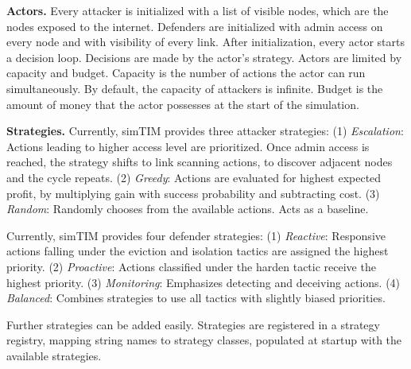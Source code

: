 \documentclass{llncs}
\begin{document}
\textbf{Actors.}
Every attacker is initialized with a list of visible nodes, which are the nodes exposed to the internet.
Defenders are initialized with admin access on every node and with visibility of every link.
After initialization, every actor starts a decision loop. Decisions are made by the actor's strategy.
Actors are limited by capacity and budget. Capacity is the number of actions the actor can run simultaneously. By default, the capacity of attackers is infinite. %
Budget is the amount of money that the actor possesses at the start of the simulation.

\textbf{Strategies.}
Currently, simTIM provides three attacker strategies:
(1) \emph{Escalation}: Actions leading to higher access level are prioritized. Once admin access is reached, the strategy shifts to link scanning actions, to discover adjacent nodes and the cycle repeats.
(2) \emph{Greedy}: Actions are evaluated for highest expected profit, by multiplying gain with success probability and subtracting cost.
(3) \emph{Random}: Randomly chooses from the available actions. Acts as a baseline.%

Currently, simTIM provides four defender strategies:
(1) \emph{Reactive}: Responsive actions falling under the eviction and isolation tactics are assigned the highest priority.
(2) \emph{Proactive}: Actions classified under the harden tactic receive the highest priority.
(3) \emph{Monitoring}: Emphasizes detecting and deceiving actions.
(4) \emph{Balanced}: Combines strategies to use all tactics with slightly biased priorities.

Further strategies can be added easily.
Strategies are registered in a strategy registry, mapping string names to strategy classes, populated at startup with the available strategies.
\end{document}
